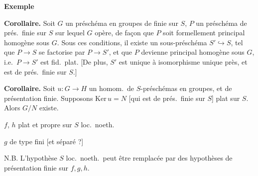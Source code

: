 \documentclass[11pt,a4paper]{article}
\begin{document}
\textbf{Exemple}

\textbf{Corollaire.} Soit $G$ un préschéma en groupes de   finie sur $S$,  $P$ un  préschéma de prés.\ finie sur $S$ sur lequel $G$ opère, de façon que $P$ soit formellement principal homogène sous $G$. Sous ces conditions, il existe un sous-préschéma $S'\hookrightarrow S$, tel que $P\to S$ se factorise par $P\to S'$, et que  $P$ devienne  principal homogène sous $G$, i.e.\ $P\to S'$ est  fid.\ plat. [De plus, $S'$ est unique à isomorphisme unique près, et est de prés.\ finie sur $S$.]

\textbf{Corollaire.} Soit $u\colon G\to H$ un homom.\ de $S$-préschémas en groupes,  et de présentation finie. Supposons $\mathrm{Ker}\,u=N$ [qui est de prés.\ finie sur $S$] plat sur $S$. Alors  $G/N$ existe.





$f$, $h$ plat et propre sur $S$ loc.\ noeth.

$g$  de type fini [et séparé ?]


N.B. L'hypothèse $S$ loc.\ noeth.\ peut être remplacée par des hypothèses de présentation finie sur $f,g,h$.
\end{document}

